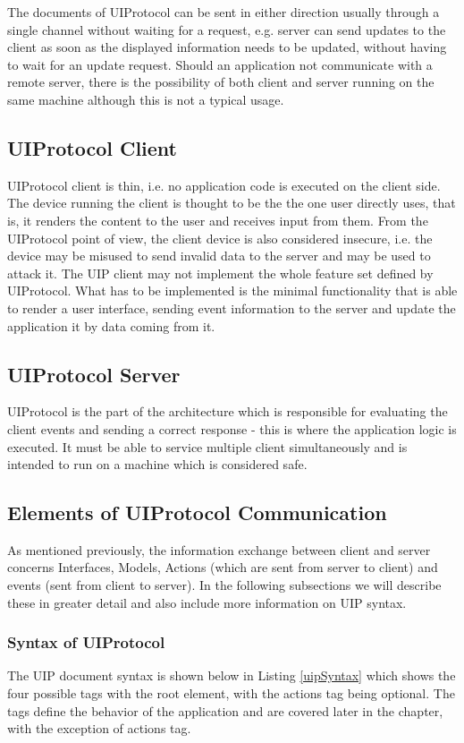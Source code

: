 The documents of UIProtocol can be sent in either direction usually through a single channel without waiting for a request, e.g. server can send updates to the client as soon as the displayed information needs to be updated, without having to wait for an update request. Should an application not communicate with a remote server, there is the possibility of both client and server running on the same machine although this is not a typical usage.

\subsection{UIProtocol Client}
UIProtocol client is thin, i.e. no application code is executed on the client side. The device running the client is thought to be the the one user directly uses, that is, it renders the content to the user and receives input from them. From the UIProtocol point of view, the client device is also considered insecure, i.e. the device may be misused to send invalid data to the server and may be used to attack it. The UIP client may not implement the whole feature set defined by UIProtocol. What has to be implemented is the minimal functionality that is able to render a user interface, sending event information to the server and update the application it by data coming from it.

\subsection{UIProtocol Server}
UIProtocol is the part of the architecture which is responsible for evaluating the client events and sending a correct response - this is where the application logic is executed. It must be able to service multiple client simultaneously and is intended to run on a machine which is considered safe.

\subsection{Elements of UIProtocol Communication}
As mentioned previously, the information exchange between client and server concerns Interfaces, Models, Actions (which are sent from server to client) and events (sent from client to server). In the following subsections we will describe these in greater detail and also include more information on UIP syntax.

\subsubsection{Syntax of UIProtocol}
The UIP document syntax is shown below in Listing \ref{uipSyntax} which shows the four possible tags with the root element, with the actions tag being optional. The tags define the behavior of the application and are covered later in the chapter, with the exception of actions tag.

